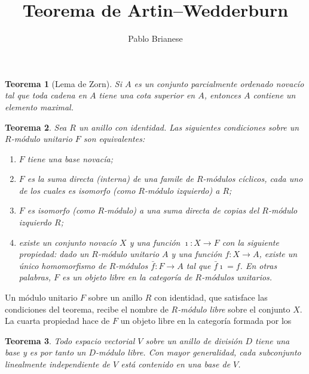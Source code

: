 \documentclass{report}
\title{Teorema de Artin--Wedderburn}
\author{Pablo Brianese}
\newtheorem{theorem}{Teorema}
\begin{document}
  \maketitle

  \begin{theorem}[Lema de Zorn]
    Si \(A\) es un conjunto parcialmente ordenado novacío tal que toda cadena en \(A\) tiene una cota superior en \(A\), entonces \(A\) contiene un elemento maximal.
  \end{theorem}

  \begin{theorem}
    Sea \(R\) un anillo con identidad.
    Las siguientes condiciones sobre un \(R\)-módulo unitario \(F\) son equivalentes:
    \begin{enumerate}
      \item \(F\) tiene una base novacía;
      \item \(F\) es la suma directa (interna) de una famile de \(R\)-módulos cíclicos, cada uno de los cuales es isomorfo (como \(R\)-módulo izquierdo) a \(R\);
      \item \(F\) es isomorfo (como \(R\)-módulo) a una suma directa de copias del \(R\)-módulo izquierdo \(R\);
      \item existe un conjunto novacío \(X\) y una función \(\imath : X \rightarrow F\) con la siguiente propiedad:
      dado un \(R\)-módulo unitario \(A\) y una función \(f : X \rightarrow A\), existe un único homomorfismo de \(R\)-módulos \(\bar{f} : F \rightarrow A\) tal que \(\bar{f} \imath = f\).
      En otras palabras, \(F\) es un objeto libre en la categoría de \(R\)-módulos unitarios.
    \end{enumerate}
  \end{theorem}

  Un módulo unitario \(F\) sobre un anillo \(R\) con identidad, que satisface las condiciones del teorema, recibe el nombre de \emph{\(R\)-módulo libre} sobre el conjunto \(X\).
  La cuarta propiedad hace de \(F\) un objeto libre en la categoría formada por los 

  \begin{theorem}
    Todo espacio vectorial \(V\) sobre un anillo de división \(D\) tiene una base y es por tanto un \(D\)-módulo libre.
    Con mayor generalidad, cada subconjunto linealmente independiente de \(V\) está contenido en una base de \(V\).
  \end{theorem}
\end{document}
